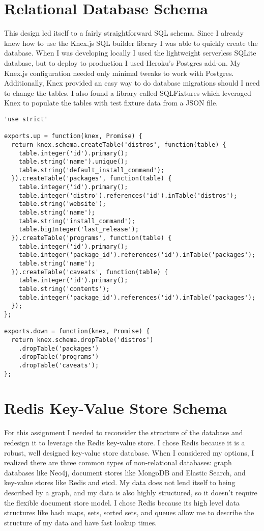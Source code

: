 \documentclass[12pt]{article}
\begin{document}
\section{Relational Database Schema}
This design led itself to a fairly straightforward SQL schema. Since I already knew how to use the Knex.js SQL builder library I was able to quickly create the database. When I was developing locally I used the lightweight serverless SQLite database, but to deploy to production I used Heroku's Postgres add-on. My Knex.js configuration needed only minimal tweaks to work with Postgres. Additionally, Knex provided an easy way to do database migrations should I need to change the tables. I also found a library called SQLFixtures which leveraged Knex to populate the tables with test fixture data from a JSON file.

\begin{lstlisting}
'use strict'

exports.up = function(knex, Promise) {
  return knex.schema.createTable('distros', function(table) {
    table.integer('id').primary();
    table.string('name').unique();
    table.string('default_install_command');
  }).createTable('packages', function(table) {
    table.integer('id').primary();
    table.integer('distro').references('id').inTable('distros');
    table.string('website');
    table.string('name');
    table.string('install_command');
    table.bigInteger('last_release');
  }).createTable('programs', function(table) {
    table.integer('id').primary();
    table.integer('package_id').references('id').inTable('packages');
    table.string('name');
  }).createTable('caveats', function(table) {
    table.integer('id').primary();
    table.string('contents');
    table.integer('package_id').references('id').inTable('packages');
  });
};

exports.down = function(knex, Promise) {
  return knex.schema.dropTable('distros')
    .dropTable('packages')
    .dropTable('programs')
    .dropTable('caveats');
};
\end{lstlisting}


\section{Redis Key-Value Store Schema}
For this assignment I needed to reconsider the structure of the database and redesign it to leverage the Redis key-value store. I chose Redis because it is a robust, well designed key-value store database. When I considered my options, I realized there are three common types of non-relational databases: graph databases like Neo4j, document stores like MongoDB and Elastic Search, and key-value stores like Redis and etcd. My data does not lend itself to  being described by a graph, and my data is also highly structured, so it doesn't require the flexible document store model. I chose Redis because its high level data structures like hash maps, sets, sorted sets, and queues allow me to describe the structure of my data and have fast lookup times.
\end{document}
